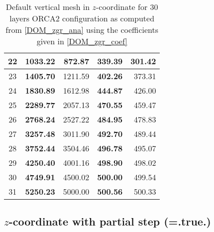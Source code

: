 \documentclass[NEMO_book]{subfiles}
\begin{document}
\begin{table}
\begin{center}
\begin{tabular}{c||r|r|r|r}
22	& 	\textbf{1033.22}&	 872.87 & 	\textbf{339.39} & 	301.42 \\ \hline
23	& 	\textbf{1405.70}&	1211.59 & \textbf{402.26} & 	373.31 \\ \hline
24	& 	\textbf{1830.89}&	1612.98 & \textbf{444.87} & 	426.00 \\ \hline
25	& 	\textbf{2289.77}&	2057.13 & \textbf{470.55} & 	459.47 \\ \hline
26	& 	\textbf{2768.24}&	2527.22 & \textbf{484.95} & 	478.83 \\ \hline
27	& 	\textbf{3257.48}&	3011.90 & \textbf{492.70} & 	489.44 \\ \hline
28	& 	\textbf{3752.44}&	3504.46 & \textbf{496.78} & 	495.07 \\ \hline
29	& 	\textbf{4250.40}&	4001.16 & \textbf{498.90} & 	498.02 \\ \hline
30	& 	\textbf{4749.91}&	4500.02 & \textbf{500.00} &	499.54 \\ \hline
31	& 	\textbf{5250.23}&	5000.00 &	\textbf{500.56} &	500.33 \\ \hline
\end{tabular} \end{center} 
\caption{ \label{Tab_orca_zgr}   
Default vertical mesh in $z$-coordinate for 30 layers ORCA2 configuration as computed 
from \eqref{DOM_zgr_ana} using the coefficients given in \eqref{DOM_zgr_coef}}
\end{table}

\subsection   [$z$-coordinate with partial step (\np{ln\_zps})]
			{$z$-coordinate with partial step (=.true.)}
\label{DOM_zps}
\end{document}
